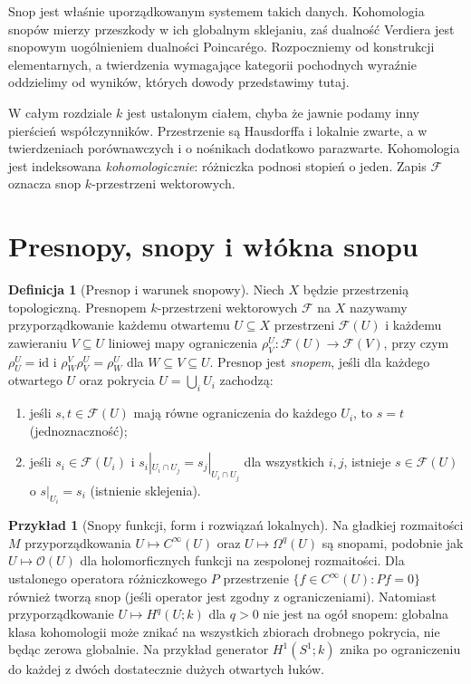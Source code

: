 \documentclass[11pt,a4paper,oneside]{report}
\newcommand{\id}{\mathrm{id}}
\theoremstyle{plain}
\theoremstyle{definition}
\newtheorem{definicja}[twierdzenie]{Definicja}
\newtheorem{przyklad}[twierdzenie]{Przykład}
\theoremstyle{remark}
\begin{document}
Snop jest właśnie uporządkowanym systemem takich danych. Kohomologia
snopów mierzy przeszkody w ich globalnym sklejaniu, zaś dualność Verdiera
jest snopowym uogólnieniem dualności Poincarégo. Rozpoczniemy od
konstrukcji elementarnych, a twierdzenia wymagające kategorii pochodnych
wyraźnie oddzielimy od wyników, których dowody przedstawimy tutaj.

W całym rozdziale $k$ jest ustalonym ciałem, chyba że jawnie podamy inny
pierścień współczynników. Przestrzenie są Hausdorffa i lokalnie zwarte,
a w twierdzeniach porównawczych i o nośnikach dodatkowo parazwarte.
Kohomologia jest indeksowana \emph{kohomologicznie}: różniczka podnosi
stopień o jeden. Zapis $\mathcal F$ oznacza snop $k$-przestrzeni wektorowych.

\section{Presnopy, snopy i włókna snopu}
\begin{definicja}[Presnop i warunek snopowy]
\label{def:sheaf-v12}
Niech $X$ będzie przestrzenią topologiczną. Presnopem
$k$-przestrzeni wektorowych $\mathcal F$ na $X$ nazywamy przyporządkowanie
każdemu otwartemu $U\subseteq X$ przestrzeni $\mathcal F(U)$ i każdemu
zawieraniu $V\subseteq U$ liniowej mapy ograniczenia
$\rho^U_V:\mathcal F(U)\to\mathcal F(V)$, przy czym
$\rho^U_U=\id$ i $\rho^V_W\rho^U_V=\rho^U_W$ dla $W\subseteq V\subseteq U$.
Presnop jest \emph{snopem}, jeśli dla każdego otwartego $U$ oraz
pokrycia $U=\bigcup_iU_i$ zachodzą:
\begin{enumerate}[label=(\roman*)]
\item jeśli $s,t\in\mathcal F(U)$ mają równe ograniczenia do każdego $U_i$,
  to $s=t$ (jednoznaczność);
\item jeśli $s_i\in\mathcal F(U_i)$ i
  $s_i|_{U_i\cap U_j}=s_j|_{U_i\cap U_j}$ dla wszystkich $i,j$,
  istnieje $s\in\mathcal F(U)$ o $s|_{U_i}=s_i$ (istnienie sklejenia).
\end{enumerate}
\end{definicja}

\begin{przyklad}[Snopy funkcji, form i rozwiązań lokalnych]
Na gładkiej rozmaitości $M$ przyporządkowania
$U\mapsto C^\infty(U)$ oraz $U\mapsto\Omega^q(U)$ są snopami,
podobnie jak $U\mapsto\mathcal O(U)$ dla holomorficznych funkcji na
zespolonej rozmaitości. Dla ustalonego operatora różniczkowego $P$
przestrzenie $\{f\in C^\infty(U):Pf=0\}$ również tworzą snop
(jeśli operator jest zgodny z ograniczeniami).
Natomiast przyporządkowanie $U\mapsto H^q(U;k)$ dla $q>0$ nie jest
na ogół snopem: globalna klasa kohomologii może znikać na wszystkich
zbiorach drobnego pokrycia, nie będąc zerowa globalnie.
Na przykład generator $H^1(S^1;k)$ znika po ograniczeniu
do każdej z dwóch dostatecznie dużych otwartych łuków.
\end{przyklad}
\end{document}
